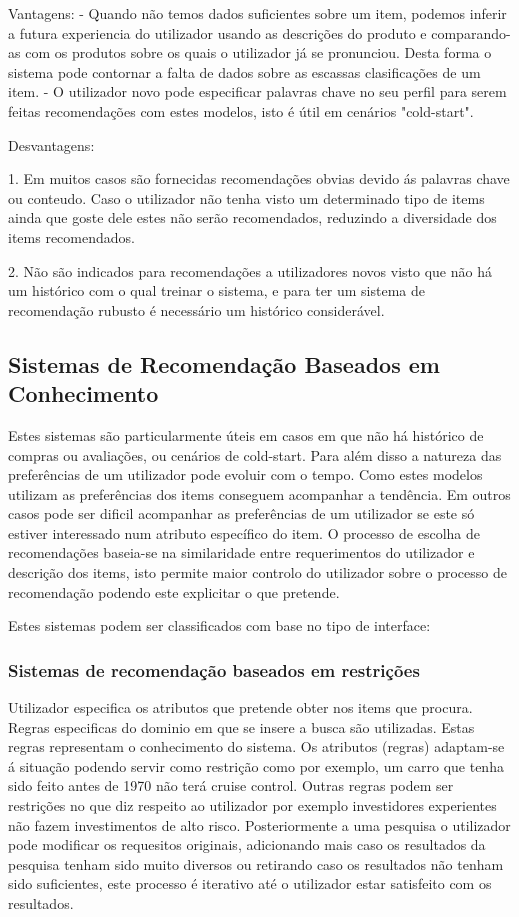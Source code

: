 Vantagens:
- Quando não temos dados suficientes sobre um item, podemos inferir a futura experiencia do utilizador usando as descrições do produto e comparando-as com os produtos sobre os quais o utilizador já se pronunciou. Desta forma o sistema pode contornar a falta de dados sobre as escassas clasificações de um item.
- O utilizador novo pode especificar palavras chave no seu perfil para serem feitas recomendações com estes modelos, isto é útil em cenários "cold-start".

Desvantagens:

1. Em muitos casos são fornecidas recomendações obvias devido ás palavras chave ou conteudo. Caso o utilizador não tenha visto um determinado tipo de items ainda que goste dele estes não serão recomendados, reduzindo a diversidade dos items recomendados.

2. Não são indicados para recomendações a utilizadores novos visto que não há um histórico com o qual treinar o sistema, e para ter um sistema de recomendação rubusto é necessário um histórico considerável.



\subsection{Sistemas de Recomendação Baseados em Conhecimento}

Estes sistemas são particularmente úteis em casos em que não há histórico de compras ou avaliações, ou cenários de cold-start.
Para além disso a natureza das preferências de um utilizador pode evoluir com o tempo. Como estes modelos utilizam as preferências dos items conseguem acompanhar a tendência. 
Em outros casos pode ser dificil acompanhar as preferências de um utilizador se este só estiver interessado num atributo específico do item.
O processo de escolha de recomendações baseia-se na similaridade entre requerimentos do utilizador e descrição dos items, isto permite maior controlo do utilizador sobre o processo de recomendação podendo este explicitar o que pretende.

Estes sistemas podem ser classificados com base no tipo de interface:

\subsubsection{Sistemas de recomendação baseados em restrições}

 Utilizador especifica os atributos que pretende obter nos items que procura. Regras especificas do dominio em que se insere a busca são utilizadas. Estas regras representam o conhecimento do sistema. Os atributos (regras) adaptam-se á situação podendo servir como restrição como por exemplo, um carro que tenha sido feito  antes de 1970 não terá cruise control. Outras regras podem ser restrições no que diz respeito ao utilizador por exemplo investidores experientes não fazem investimentos de alto risco. 
 Posteriormente a uma pesquisa o utilizador pode modificar os requesitos originais, adicionando mais caso os resultados da pesquisa tenham sido muito diversos ou retirando caso os resultados não tenham sido suficientes, este processo é iterativo até o utilizador estar satisfeito com os resultados.  


